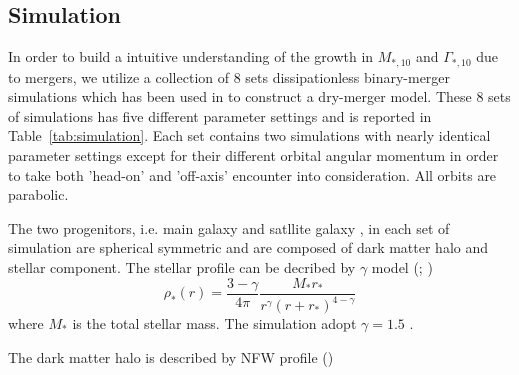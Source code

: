 \documentclass[fleqn,usenatbib]{mnras}
\begin{document}
\subsection{Simulation}
In order to build a intuitive understanding of the growth in $M_{*,10}$ and $\Gamma_{*,10}$ due to mergers, we utilize a collection of 8 sets dissipationless binary-merger simulations which has been used in \cite{sonnenfeld2014} to construct a dry-merger model. These 8 sets of simulations has five different parameter settings and is reported in Table~\ref{tab:simulation}. 
Each set contains two simulations with nearly identical parameter settings except for their different orbital angular momentum in order to take both 'head-on' and 'off-axis' encounter into consideration. All orbits are parabolic.   
\begin{table}
    \centering
    \caption{Simulation parameters for different sets of simulation. }
    \label{tab:simulation}
\end{table}
\par The two progenitors, i.e. main galaxy and satllite galaxy , in each set of simulation are spherical symmetric and are composed of dark matter halo and stellar component. The stellar profile can be decribed by $\gamma$ model (\cite{Dehnen93}; \cite{Tremaine94})
\begin{equation}
    \label{eq:profile_stellar}
    \rho_*(r) = \frac{3-\gamma}{4\pi}\frac{M_*r_*}{r^\gamma (r+r_*)^{4-\gamma}}
\end{equation}  
where $M_*$ is the total stellar mass. The simulation adopt $\gamma = 1.5$ . 
\par The dark matter halo is described by NFW profile (\cite{NFW})
\end{document}

